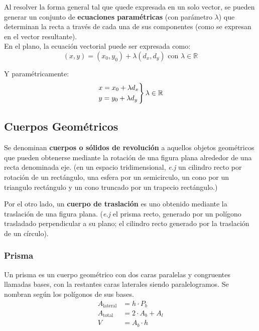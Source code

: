 Al resolver la forma general tal que quede expresada en un solo vector, se pueden generar un conjunto de \textbf{ecuaciones paramétricas} (con parámetro $\lambda$) que determinan la recta a través de cada una de sus componentes (como se expresan en el vector resultante).\\

En el plano, la ecuación vectorial puede ser expresada como:\\

\begin{equation*}
(x, y) = (x_0, y_0) + \lambda(d_x,d_y) \text{ con } \lambda \in \mathbb{R}
\end{equation*}

Y paramétricamente:
\begin{equation*}
    \begin{rcases}
      x = x_0 + \lambda d_x \\
      y = y_0 + \lambda d_y
    \end{rcases}
    \lambda \in \mathbb{R}
    \end{equation*}
\subsection{Cuerpos Geométricos}
Se denominan \textbf{cuerpos o sólidos de revolución} a aquellos objetos geométricos que pueden obtenerse mediante la rotación de una figura plana alrededor de una recta denominada eje. (en un espacio tridimensional, \textit{e.j} un cilindro recto por rotación de un rectángulo, una esfera por un semicirculo, un cono por un triangulo rectángulo y un cono truncado por un trapecio rectángulo.)

Por el otro lado, un \textbf{cuerpo de traslación} es uno obtenido mediante la traslación de una figura plana. (\textit{e.j} el prisma recto, generado por un polígono trasladado perpendicular a su plano; el cilindro recto generado por la traslación de un círculo).

\subsubsection{Prisma}
Un prisma es un cuerpo geométrico con dos caras paralelas y congruentes llamadas bases, con la restantes caras laterales siendo paralelogramos. Se nombran según los polígonos de sus bases. \\
\begin{equation*}
    \begin{split} 
    A_{\text{lateral}} &= h \cdot P_b\\
    A_{\text{total}} &= 2\cdot A_b + A_l\\
    V &= A_b\cdot h
    \end{split}
\end{equation*}

